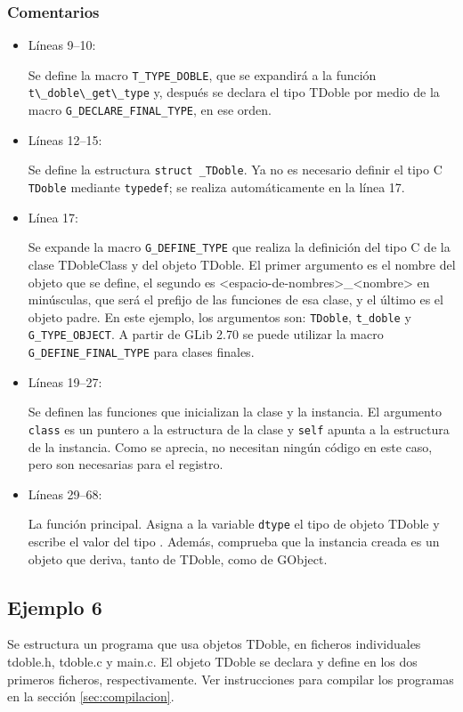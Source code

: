 \subsubsection{Comentarios}
\begin{itemize}
\item Líneas 9--10:\par
  Se define la macro \texttt{T\_TYPE\_DOBLE}, que se expandirá a la función
  \passthrough{\lstinline!t\_doble\_get\_type!} y, después se declara el tipo \textsf{TDoble} por medio
  de la macro \texttt{G\_DECLARE\_FINAL\_TYPE}, en ese orden.
\item Líneas 12--15:\par
  Se define la estructura \texttt{struct \_TDoble}. Ya no es necesario definir el tipo C \texttt{TDoble} mediante
  \texttt{typedef}; se realiza automáticamente en la línea 17.
\item Línea 17:\par
  Se expande la macro \texttt{G\_DEFINE\_TYPE} que realiza la definición del tipo C de la clase
  \textsf{TDobleClass} y del objeto \textsf{TDoble}.
  El primer argumento es el nombre del objeto que se define,   el segundo es \textsf{<espacio-de-nombres>\_<nombre>} en minúsculas, que será el prefijo de las funciones de esa clase,
  y el último es el objeto padre.
  En este ejemplo, los argumentos son: \texttt{TDoble}, \texttt{t\_doble} y \texttt{G\_TYPE\_OBJECT}.
  A partir de \textsf{GLib 2.70} se puede utilizar la macro \texttt{G\_DEFINE\_FINAL\_TYPE} para clases finales.
\item Líneas 19--27:\par
  Se definen las funciones que inicializan la clase y la instancia. El argumento \texttt{class} es un puntero a la
  estructura de la clase y \texttt{self} apunta a la estructura de la instancia. Como se aprecia, no
  necesitan ningún código en este caso, pero son necesarias para el registro.
\item Líneas 29--68:\par
  La función principal. Asigna a la variable \texttt{dtype} el tipo de objeto \textsf{TDoble} y escribe el valor
  del tipo . Además, comprueba que la instancia creada es un objeto que deriva, tanto de
  \textsf{TDoble}, como de \textsf{GObject}.
\end{itemize}

\subsection{Ejemplo 6}
Se estructura un programa que usa objetos \textsf{TDoble}, en ficheros individuales \textsf{tdoble.h},
\textsf{tdoble.c} y \textsf{main.c}.
El objeto \textsf{TDoble} se declara y define en los dos primeros ficheros, respectivamente.
Ver instrucciones para compilar los programas en la sección \ref{sec:compilacion}.

